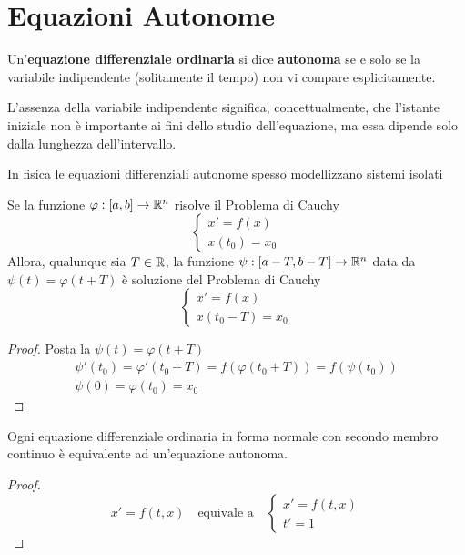 \section{Equazioni Autonome}
\begin{definition}
	\label{def:equaz_diff_auton}
	Un'\textbf{equazione differenziale ordinaria} si dice \textbf{autonoma} se e solo se la variabile indipendente (solitamente il tempo) non vi compare esplicitamente.
	\begin{note}
		L'assenza della variabile indipendente significa, concettualmente, che l'istante iniziale non è importante ai fini dello studio dell'equazione, ma essa dipende solo dalla lunghezza dell'intervallo.
	\end{note}
	\begin{note}
		In fisica le equazioni differenziali autonome spesso modellizzano sistemi isolati
	\end{note}
\end{definition}
\begin{proposition}
	Se la funzione $\varphi: \left[a,b\right] \to \mathbb{R}^n$ risolve il Problema di Cauchy
	\begin{equation*}\begin{cases}
		x'=f(x)\\
		x(t_0) = x_0
	\end{cases}\end{equation*}
	Allora, qualunque sia $T \in \mathbb{R}$, la funzione $\psi: \left[a - T,b - T\right] \to \mathbb{R}^n$ data da $\psi(t) = \varphi(t + T)$ è soluzione del Problema di Cauchy
	\begin{equation*}\begin{cases}
		x'=f(x)\\
		x(t_0 - T) = x_0
	\end{cases}\end{equation*}
	\begin{proof}
		Posta la $\psi(t)=\varphi(t+T)$
		\begin{equation*}\begin{gathered}
			\psi'(t_0)= \varphi'(t_0+T)=f(\varphi(t_0+T))=f(\psi(t_0))\\
			\psi(0)=\varphi(t_0)=x_0
		\end{gathered}\end{equation*}
	\end{proof}
\end{proposition}
\begin{proposition}
	Ogni equazione differenziale ordinaria in forma normale con secondo membro continuo è equivalente ad un'equazione autonoma.
	\begin{proof}
		\begin{equation*}
			x' = f(t,x)
			\quad\text{equivale a}\quad
			\begin{cases}
				x'=f(t,x)\\
				t'=1
			\end{cases}
		\end{equation*}
	\end{proof}
\end{proposition}
